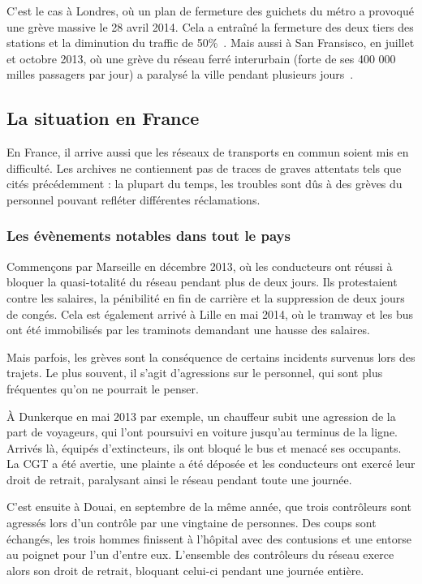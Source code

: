 	C'est le cas à Londres, où un plan de fermeture des guichets du métro a provoqué une grève massive le 28 avril 2014. Cela a entraîné la fermeture des deux tiers des stations et la diminution du traffic de 50\%~\cite{tubeApril}. Mais aussi à San Fransisco, en juillet et octobre 2013, où une grève du réseau ferré interurbain (forte de ses 400 000 milles passagers par jour) a paralysé la ville pendant plusieurs jours~\cite{SFbart}.

	\subsection{La situation en France}
	
	En France, il arrive aussi que les réseaux de transports en commun soient mis en difficulté. Les archives ne contiennent pas de traces de graves attentats tels que cités précédemment : la plupart du temps, les troubles sont dûs à des grèves du personnel pouvant refléter différentes réclamations.
	
	\subsubsection{ Les évènements notables dans tout le pays }

	Commençons par Marseille en décembre 2013, où les conducteurs ont réussi à bloquer la quasi-totalité du réseau pendant plus de deux jours. Ils protestaient contre les salaires, la pénibilité en fin de carrière et la suppression de deux jours de congés. Cela est également arrivé à Lille en mai 2014, où le tramway et les bus ont été immobilisés par les traminots demandant une hausse des salaires.

	Mais parfois, les grèves sont la conséquence de certains incidents survenus lors des trajets. Le plus souvent, il s'agit d'agressions sur le personnel, qui sont plus fréquentes qu'on ne pourrait le penser.

	À Dunkerque en mai 2013 par exemple, un chauffeur subit une agression de la part de voyageurs, qui l'ont poursuivi en voiture jusqu'au terminus de la ligne. Arrivés là, équipés d'extincteurs, ils ont bloqué le bus et menacé ses occupants. La CGT a été avertie, une plainte a été déposée et les conducteurs ont exercé leur droit de retrait, paralysant ainsi le réseau pendant toute une journée.

	C'est ensuite à Douai, en septembre de la même année, que trois contrôleurs sont agressés lors d'un contrôle par une vingtaine de personnes. Des coups sont échangés, les trois hommes finissent à l'hôpital avec des contusions et une entorse au poignet pour l'un d'entre eux. L'ensemble des contrôleurs du réseau exerce alors son droit de retrait, bloquant celui-ci pendant une journée entière.

